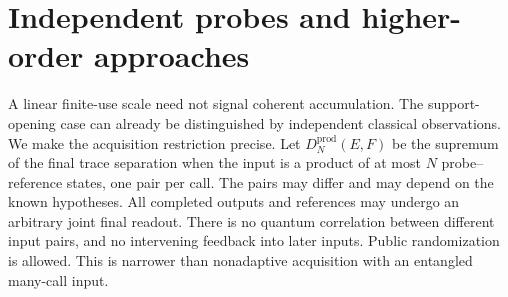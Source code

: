 \section{Independent probes and higher-order approaches}
\label{sec:independent86}
A linear finite-use scale need not signal coherent accumulation.
The support-opening case can already be distinguished by independent
classical observations.  We make the acquisition restriction precise.
Let $D_N^{\mathrm{prod}}(E,F)$ be the supremum of the final trace
separation when the input is a product of at most $N$ probe--reference
states, one pair per call.  The pairs may differ and may depend on the
known hypotheses.  All completed outputs and references may undergo
an arbitrary joint final readout.  There is no quantum correlation
between different input pairs, and no intervening feedback into later
inputs.  Public randomization is allowed.  This is narrower than
nonadaptive acquisition with an entangled many-call input.


